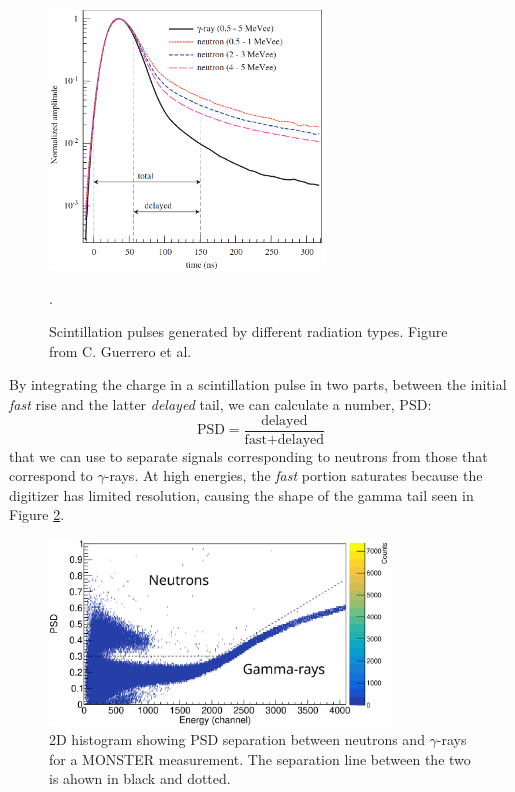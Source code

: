 \documentclass[a4paper,12pt]{report}
\begin{document}
\begin{figure}[H]
	\centering
	\includegraphics[width=0.65\textwidth]{psd_explanation.png}
	\caption{Scintillation pulses generated by different radiation types.
	Figure from C. Guerrero et al. \cite{guerrero2008}}.
	\label{psd_explanation}
\end{figure}

By integrating the charge in a scintillation pulse in two parts, between the initial \textit{fast} rise and the latter \textit{delayed} tail, we can calculate a number, PSD:
\begin{equation}
	\text{PSD} = \frac{\text{delayed}}{\text{fast}+\text{delayed}}
\end{equation}
that we can use to separate signals corresponding to neutrons from those that correspond to $\gamma$-rays.
At high energies, the \textit{fast} portion saturates because the digitizer has limited resolution, causing the shape of the gamma tail seen in Figure \ref{example_psd}.

\begin{figure}[H]
	\centering
	\includegraphics[width=0.80\textwidth]{example_psd.eps}
	\caption{2D histogram showing PSD separation between neutrons and $\gamma$-rays for a MONSTER measurement.
	The separation line between the two is ahown in black and dotted.}
	\label{example_psd}
\end{figure}
\end{document}

